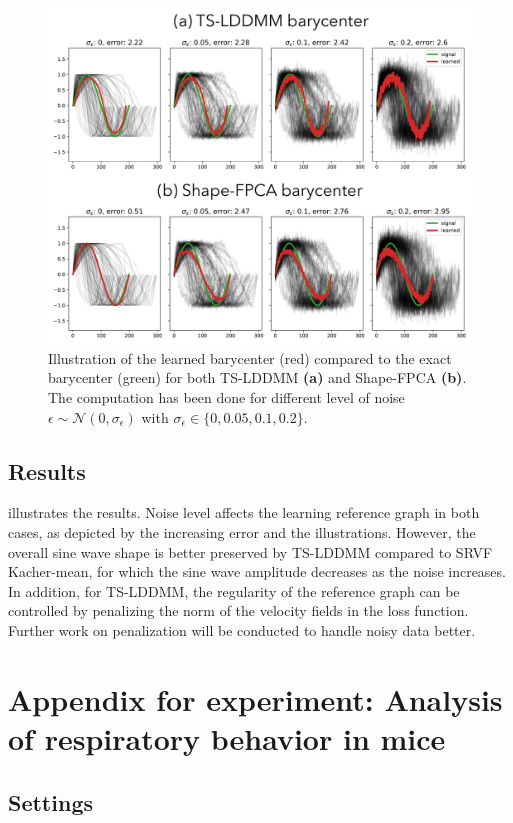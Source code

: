 \begin{figure}
  \centering
  \includegraphics[width = 0.9\linewidth]{pictures/noise sensitivity/noise sensitivity.pdf}
  \caption{Illustration of the learned barycenter (red) compared to the exact barycenter (green) for both TS-LDDMM \textbf{(a)} and Shape-FPCA \textbf{(b)}. The computation has been done for different level of noise $\epsilon \sim \mathcal{N}(0,\sigma_\epsilon)$ with $\sigma_\epsilon \in \{0,0.05,0.1,0.2\}$.}
  \label{fig: noise sensitivity}
\end{figure}

\subsection{Results}
 illustrates the results. Noise level affects the learning reference graph in both cases, as depicted by the increasing error and the illustrations. However, the overall sine wave shape is better preserved by TS-LDDMM compared to SRVF Kacher-mean, for which the sine wave amplitude decreases as the noise increases. In addition, for TS-LDDMM, the regularity of the reference graph can be controlled by penalizing the norm of the velocity fields in the loss function. Further work on penalization will be conducted to handle noisy data better.


\section{Appendix for experiment: Analysis of respiratory behavior in mice}
\label{appendix: mice_exp_setting}

\subsection{Settings}

